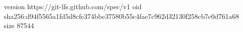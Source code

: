 version https://git-lfs.github.com/spec/v1
oid sha256:d94f5565a1fd5d8cfc374bbc37580b55c4fae7c962d32130f258cb7c0d761a68
size 87544
